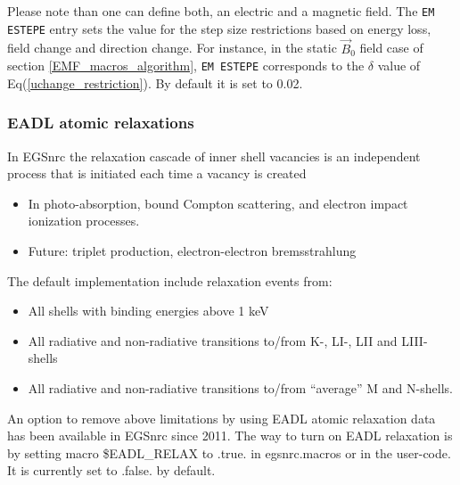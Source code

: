 Please note than one can define both, an electric and a magnetic field. The {\tt EM ESTEPE}
entry sets the value for the step size restrictions based on energy loss, field change and
direction change. For instance, in the static $\vec{B}_0$ field case of section \ref{EMF_macros_algorithm},
{\tt EM ESTEPE} corresponds to the $\delta$ value of Eq(\ref{uchange_restriction}). By default it is set to 0.02.

\subsubsection{EADL atomic relaxations}
In EGSnrc the relaxation cascade of inner shell vacancies is an independent process that is initiated each time
a vacancy is created
\begin{itemize}
  \item In photo-absorption, bound Compton scattering, and electron impact ionization processes.
  \item Future: triplet production, electron-electron bremsstrahlung
\end{itemize}

The default implementation include relaxation events from:
\begin{itemize}
\item All shells with binding energies above 1 keV
\item All radiative and non-radiative transitions to/from K-, LI-, LII and LIII-shells
\item All radiative and non-radiative transitions to/from ``average'' M and N-shells.
\end{itemize}

An option to remove above limitations by using EADL atomic relaxation data has been available in EGSnrc since 2011.
The way to turn on EADL relaxation is by setting macro \$EADL\_RELAX to .true. in egsnrc.macros or in the user-code. It is currently set to .false. by default.

